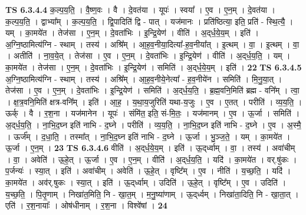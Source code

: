 \documentclass[17pt]{extarticle}
\begin{document}
                  \newline
                                \textbf{ TS 6.3.4.4} \newline
                  क॒ल्प॒य॒ति॒ । वै॒ष्ण॒वः । वै । दे॒वत॑या । यूपः॑ । स्वया᳚ । ए॒व । ए॒न॒म् । दे॒वत॑या । क॒ल्प॒य॒ति॒ । द्वाभ्या᳚म् । क॒ल्प॒य॒ति॒ । द्वि॒पादिति॑ द्वि - पात् । यज॑मानः । प्रति॑ष्ठित्या॒ इति॒ प्रति॑ - स्थि॒त्यै॒ । यम् । का॒मये॑त । तेज॑सा । ए॒न॒म् । दे॒वता॑भिः । इ॒न्द्रि॒येण॑ । वीति॑ । अ॒द्‌र्ध॒ये॒य॒म् । इति॑ । अ॒ग्नि॒ष्ठामित्य॑ग्नि - स्थाम् । तस्य॑ । अश्रि᳚म् । आ॒ह॒व॒नीया॒दित्या᳚-ह॒व॒नीया᳚त् । इ॒त्थम् । वा॒ । इ॒त्थम् । वा॒ । अतीति॑ । ना॒व॒ये॒त् । तेज॑सा । ए॒व । ए॒न॒म् । दे॒वता॑भिः । इ॒न्द्रि॒येण॑ । वीति॑ । अ॒द्‌र्ध॒य॒ति॒ । यम् । का॒मये॑त । तेज॑सा । ए॒न॒म् । दे॒वता॑भिः । इ॒न्द्रि॒येण॑ । समिति॑ । अ॒द्‌र्ध॒ये॒य॒म् । इति॑ । \textbf{  22} \newline
                  \newline
                                \textbf{ TS 6.3.4.5} \newline
                  अ॒ग्नि॒ष्ठामित्य॑ग्नि - स्थाम् । तस्य॑ । अश्रि᳚म् । आ॒ह॒व॒नीये॒नेत्या᳚ - ह॒व॒नीये॑न । समिति॑ । मि॒नु॒या॒त् । तेज॑सा । ए॒व । ए॒न॒म् । दे॒वता॑भिः । इ॒न्द्रि॒येण॑ । समिति॑ । अ॒द्‌र्ध॒य॒ति॒ । ब्र॒ह्म॒वनि॒मिति॑ ब्रह्म - वनि᳚म् । त्वा॒ । क्ष॒त्र॒वनि॒मिति॑ क्षत्र-वनि᳚म् । इति॑ । आ॒ह॒ । य॒था॒य॒जुरिति॑ यथा-य॒जुः । ए॒व । ए॒तत् । परीति॑ । व्य॒य॒ति॒ । ऊर्क् । वै । र॒श॒ना । यज॑मानेन । यूपः॑ । संमि॑त॒ इति॒ सं-मि॒तः॒ । यज॑मानम् । ए॒व । ऊ॒र्जा । समिति॑ । अ॒द्‌र्ध॒य॒ति॒ । ना॒भि॒द॒घ्न इति॑ नाभि - द॒घ्ने । परीति॑ । व्य॒य॒ति॒ । ना॒भि॒द॒घ्न इति॑ नाभि - द॒घ्ने । ए॒व । अ॒स्मै॒ । ऊर्ज᳚म् । द॒धा॒ति॒ । तस्मा᳚त् । ना॒भि॒द॒घ्न इति॑ नाभि - द॒घ्ने । ऊ॒र्जा । भु॒ञ्ज॒ते॒ । यम् । का॒मये॑त । ऊ॒र्जा । ए॒न॒म् । \textbf{  23} \newline
                  \newline
                                \textbf{ TS 6.3.4.6} \newline
                  वीति॑ । अ॒द्‌र्ध॒ये॒य॒म् । इति॑ । ऊ॒द्‌र्ध्वाम् । वा॒ । तस्य॑ । अवा॑चीम् । वा॒ । अवेति॑ । ऊ॒हे॒त् । ऊ॒र्जा । ए॒व । ए॒न॒म् । वीति॑ । अ॒द्‌र्ध॒य॒ति॒ । यदि॑ । का॒मये॑त । वर्.षु॑कः । प॒र्जन्यः॑ । स्या॒त् । इति॑ । अवा॑चीम् । अवेति॑ । ऊ॒हे॒त् । वृष्टि᳚म् । ए॒व । नीति॑ । य॒च्छ॒ति॒ । यदि॑ । का॒मये॑त । अव॑र्.षुकः । स्या॒त् । इति॑ । ऊ॒द्‌र्ध्वाम् । उदिति॑ । ऊ॒हे॒त् । वृष्टि᳚म् । ए॒व । उदिति॑ । य॒च्छ॒ति॒ । पि॒तृ॒णाम् । निखा॑त॒मिति॒ नि - खा॒त॒म् । म॒नु॒ष्या॑णाम् । ऊ॒द्‌र्ध्वम् । निखा॑ता॒दिति॒ नि - खा॒ता॒त् । एति॑ । र॒श॒नायाः᳚ । ओष॑धीनाम् । र॒श॒ना । विश्वे॑षां । \textbf{  24} \newline
\end{document}
